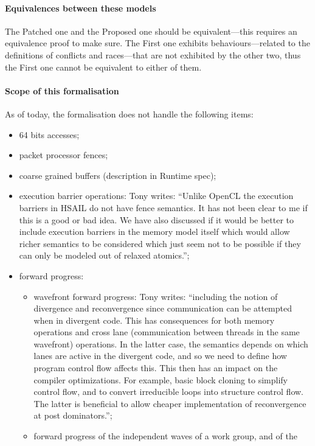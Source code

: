 \documentclass[a4paper]{article}
\begin{document}
{\color{blue} \paragraph{Equivalences between these models}

The Patched one and the Proposed one should be equivalent---this requires an
equivalence proof to make sure. The First one exhibits behaviours---related to
the definitions of conflicts and races---that are not exhibited by the other
two, thus the First one cannot be equivalent to either of them.

\paragraph{Scope of this formalisation} 

As of today, the formalisation does not handle the following items:
\begin{itemize}
\item 64 bits accesses;
\item packet processor fences;
\item coarse grained buffers (description in Runtime spec);
\item execution barrier operations: Tony writes: ``Unlike OpenCL the execution
barriers in HSAIL do not have fence semantics. It has not been clear to me if
this is a good or bad idea. We have also discussed if it would be better to
include execution barriers in the memory model itself which would allow richer
semantics to be considered which just seem not to be possible if they can only
be modeled out of relaxed atomics.'';
\item forward progress: 
  \begin{itemize}
  \item wavefront forward progress: Tony writes: ``including the notion of
divergence and reconvergence since communication can be attempted when in
divergent code. This has consequences for both memory operations and cross lane
(communication between threads in the same wavefront) operations. In the latter
case, the semantics depends on which lanes are active in the divergent code,
and so we need to define how program control flow affects this. This then has
an impact on the compiler optimizations. For example, basic block cloning to
simplify control flow, and to convert irreducible loops into structure control
flow. The latter is beneficial to allow cheaper implementation of reconvergence
at post dominators.''; 
  \item forward progress of the independent waves of a work group, and of the

\end{itemize}
\end{itemize}}
\end{document}

